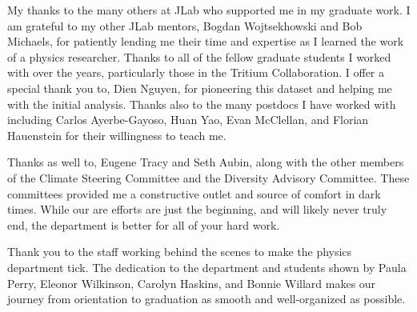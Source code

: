 \documentclass[../main.tex]{subfiles}
\begin{document}
\begin{singlespace}
{{\begin{flushleft}
My thanks to the many others at JLab who supported me in my graduate work. I am grateful to my other JLab mentors, Bogdan Wojtsekhowski and Bob Michaels, for patiently lending me their time and expertise as I learned the work of a physics researcher. Thanks to all of the fellow graduate students I worked with over the years, particularly those in the Tritium Collaboration. I offer a special thank you to, Dien Nguyen, for pioneering this dataset and helping me with the initial analysis. Thanks also to the many postdocs I have worked with including Carlos Ayerbe-Gayoso, Huan Yao, Evan McClellan, and Florian Hauenstein for their willingness to teach me.

\end{flushleft}
} %

{\parindent0pt %
\begin{flushleft}
                                                                                 
Thanks as well to, Eugene Tracy and Seth Aubin, along with the other members of the Climate Steering Committee and the Diversity Advisory Committee. These committees provided me a constructive outlet and source of comfort in dark times. While our are efforts are just the beginning, and will likely never truly end, the department is better for all of your hard work.

\end{flushleft}
} %

{\parindent0pt %
\begin{flushleft}
                                                                                 
Thank you to the staff working behind the scenes to make the physics department tick. The dedication to the department and students shown by Paula Perry, Eleonor Wilkinson, Carolyn Haskins, and Bonnie Willard makes our journey from orientation to graduation as smooth and well-organized as possible. 

\end{flushleft}
} %

{\parindent0pt %
\begin{flushleft}
                                                                                 

\end{flushleft}}}
\end{singlespace}
\end{document}
